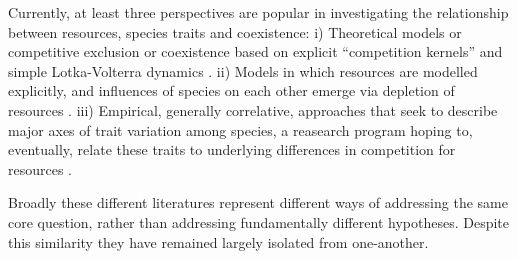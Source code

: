 \documentclass[a4paper,11pt]{article}
\begin{document}
Currently, at least three perspectives are popular in investigating
the relationship between resources, species traits and coexistence:
i) Theoretical models or competitive exclusion or coexistence based on explicit ``competition kernels'' and simple Lotka-Volterra dynamics
\citep[e.g.][]{MacArthur-1967,Case-1982,Dieckmann-1999,Leimar-2013}.
%
ii) Models in which resources are modelled explicitly, and influences of species
on each other emerge via depletion of resources
\citep[e.g.][]{Tilman-1977, Huston-1987, Kohyama-1993, Falster-2011}.
%
iii) Empirical, generally correlative, approaches that seek to
describe major axes of trait variation among species, a reasearch program
hoping to, eventually, relate these traits
to underlying differences in competition for resources
\citep[e.g.][]{Grime-1979, Weiher-1999, Westoby-2002}.




Broadly these different literatures represent different ways of
addressing the same core question, rather than addressing fundamentally
different hypotheses.  Despite this similarity they have remained
largely isolated from one-another.
\end{document}
